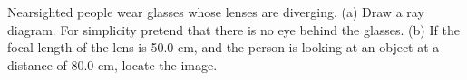 \answercheck Nearsighted people wear glasses whose lenses are
diverging. (a) Draw a ray diagram. For simplicity pretend
that there is no eye behind the glasses. 
(b) If the
focal length of the lens is 50.0 cm, and the person is
looking at an object at a distance of 80.0 cm, locate the image.
